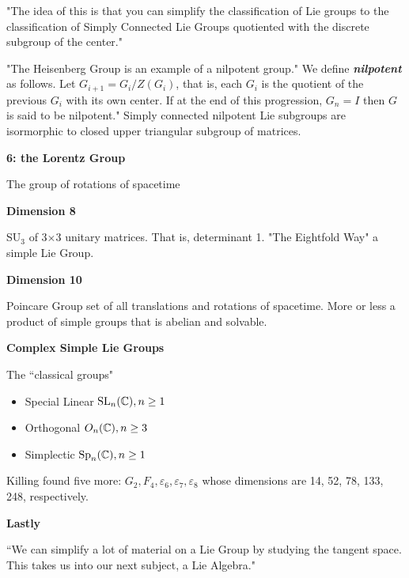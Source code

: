 \documentclass[12pt,a4paper]{report}
\newcommand{\SL}{\operatorname{SL}}
\begin{document}
\begin{description}
\begin{itemize}
 	"The idea of this is that you can simplify the classification of Lie groups to the classification of Simply Connected Lie Groups quotiented with the discrete subgroup of the center."
 	
 	"The Heisenberg Group is an example of a nilpotent group."  We define \textbf{\textit{nilpotent}} as follows.  Let $G_{i+1}=G_i/Z(G_i)$, that is, each $G_i$ is the quotient of the previous $G_i$ with its own center.  If at the end of this progression, $G_n=I$ then $G$ is said to be nilpotent."  Simply connected nilpotent Lie subgroups are isormorphic to closed upper triangular subgroup of matrices.
 	
 	\end{itemize}
 	
 	\item \textbf{6: the Lorentz Group}
 	
 	The group of rotations of spacetime
 	
 	\item \textbf{Dimension 8}
 	
 	SU$_3$ of 3$\times$3 unitary matrices.  That is, determinant 1.  "The Eightfold Way" a simple Lie Group.
 	
 	\item \textbf{Dimension 10}
 	
 	Poincare Group set of all translations and rotations of spacetime.  More or less a product of simple groups that is abelian and solvable.
 	
 	\item \textbf{Complex Simple Lie Groups}
 	
 	The ``classical groups"
 	\begin{itemize}
 		\item Special Linear $\SL_n(\C), n\ge 1$
 		\item Orthogonal $O_n(\mathbb{C}), n\ge 3$
 		\item Simplectic $\operatorname{Sp}_n(\mathbb{C}),n\ge 1$
 	\end{itemize}Killing found five more: $G_2, F_4, \varepsilon_6, \varepsilon_7, \varepsilon_8$ whose dimensions are 14, 52, 78, 133, 248, respectively.
 	
 	\item \textbf{Lastly}
 	
 	``We can simplify a lot of material on a Lie Group by studying the tangent space.  This takes us into our next subject, a Lie Algebra."

\end{description}
\end{document}
